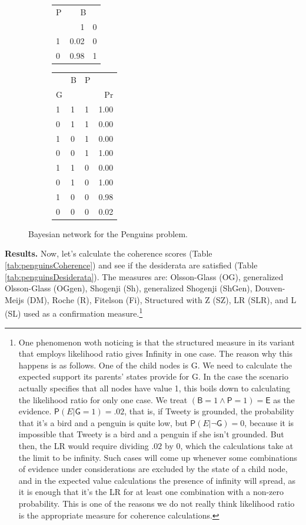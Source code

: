 \documentclass[
  10pt,
]{scrartcl}
\newcommand{\s}[1]{\textsf{#1}}
\newcommand{\pr}[1]{\mathsf{P}(#1)}
\begin{document}
\begin{figure}[H]
{\begin{subfigure}[!ht]{0.4\textwidth}
\begin{tabular}{lrr}
\toprule
\multicolumn{1}{c}{P} & \multicolumn{2}{c}{B} \\
  & 1 & 0\\
\midrule
1 & 0.02 & 0\\
0 & 0.98 & 1\\
\bottomrule
\end{tabular}


\begin{tabular}{lllr}
\toprule
\multicolumn{1}{c}{} & \multicolumn{1}{c}{B} & \multicolumn{1}{c}{P} & \multicolumn{1}{c}{} \\
G &  &  & Pr\\
\midrule
1 & 1 & 1 & 1.00\\
0 & 1 & 1 & 0.00\\
1 & 0 & 1 & 0.00\\
0 & 0 & 1 & 1.00\\
1 & 1 & 0 & 0.00\\
0 & 1 & 0 & 1.00\\
1 & 0 & 0 & 0.98\\
0 & 0 & 0 & 0.02\\
\bottomrule
\end{tabular}
\end{subfigure}}
\caption{Bayesian network for the Penguins problem.}
\label{fig:BGP}
\end{figure}

\noindent \textbf{Results.} Now, let's calculate the coherence scores (Table \ref{tab:penguinsCoherence}) and see if the desiderata are satisfied (Table \ref{tab:penguinsDesiderata}). The measures are: Olsson-Glass (OG), generalized Olsson-Glass (OGgen), Shogenji (Sh), generalized Shogenji (ShGen), Douven-Meijs (DM), Roche (R), Fitelson (Fi), Structured with Z (SZ), LR (SLR), and L (SL) used as a confirmation measure.\footnote{One phenomenon woth noticing is that the structured measure in its variant that employs likelihood ratio gives \s{Infinity} in one case. The reason why this happens is as follows. One of the child nodes is \s{G}. We need to calculate the expected support its parents' states provide for \s{G}. In the case the scenario actually specifies that all nodes have value 1, this boils down to calculating the likelihood ratio for only one case. We treat \((\s{B} = 1 \wedge \s{P} = 1)=\s{E}\) as the evidence. \(\pr{E \vert \s{G} =1} = .02\), that is, if Tweety is grounded, the probability that it's a bird and a penguin is quite low, but \(\pr{E \vert \neg \s{G}} = 0\), because it is impossible that Tweety is a bird and a penguin if she isn't grounded. But then, the LR would require dividing \(.02\) by \(0\), which the calculations take at the limit to be infinity. Such cases will come up whenever some combinations of evidence under considerations are excluded by the state of a child node, and in the expected value calculations the presence of infinity will spread, as it is enough that it's the LR for at least one combination with a non-zero probability. This is one of the reasons we do not really think likelihood ratio is the appropriate measure for coherence calculations.}
\end{document}
